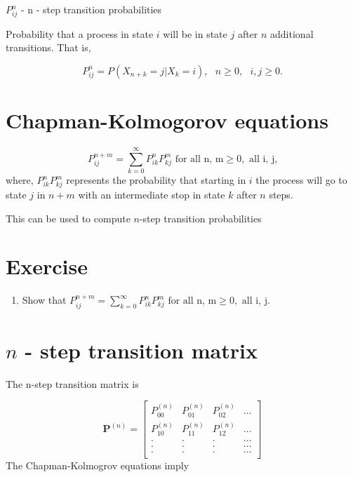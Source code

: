 \documentclass[
  letterpaper,
  DIV=11,
  numbers=noendperiod]{scrreprt}
\providecommand{\tightlist}{%
  \setlength{\itemsep}{0pt}\setlength{\parskip}{0pt}}\usepackage{longtable,booktabs,array}
\begin{document}
\(P^n_{ij}\) - n - step transition probabilities

Probability that a process in state \(i\) will be in state \(j\) after
\(n\) additional transitions. That is,

\[P^n_{ij}=P(X_{n+k}=j|X_k=i), \text{ } n\geq 0, \text{ }i, j \geq 0.\]

\section{Chapman-Kolmogorov
equations}\label{chapman-kolmogorov-equations}

\[P_{ij}^{n+m}=\sum_{k=0}^{\infty}P_{ik}^nP_{kj}^m\text{ for all n, m} \geq 0, \text{ all i, j,}\]
where, \(P^n_{ik}P^m_{kj}\) represents the probability that starting in
\(i\) the process will go to state \(j\) in \(n+m\) with an intermediate
stop in state \(k\) after \(n\) steps.

This can be used to compute \(n\)-step transition probabilities

\section{Exercise}\label{exercise-1}

\begin{enumerate}
\def\labelenumi{\arabic{enumi}.}
\tightlist
\item
  Show that
  \(P_{ij}^{n+m}=\sum_{k=0}^{\infty}P_{ik}^nP_{kj}^m\text{ for all n, m} \geq 0, \text{ all i, j.}\)
\end{enumerate}

\section{\texorpdfstring{\(n\) - step transition
matrix}{n - step transition matrix}}\label{n---step-transition-matrix}

The n-step transition matrix is

\[\mathbf{P}^{(n)} = \left[\begin{array}
{rrrr}
P_{00}^{(n)} & P_{01}^{(n)} & P_{02}^{(n)} & ...\\
P_{10}^{(n)} & P_{11}^{(n)} & P_{12}^{(n)} & ...\\
. & .  & . & ...\\
. & .  & . & ...\\
. & .  & . & ...\\
\end{array}\right]
\] The Chapman-Kolmogrov equations imply
\end{document}
